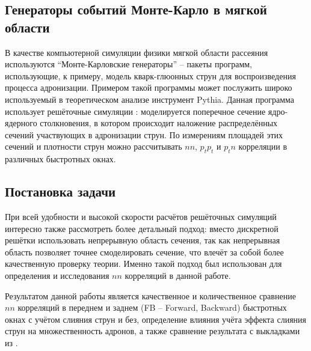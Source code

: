 \subsection{Генераторы событий Монте-Карло в мягкой области}
В качестве компьютерной симуляции физики мягкой области рассеяния используются ``Монте-Карловские генераторы'' \cite{MonteCarlo1,MonteCarlo2} -- пакеты программ, использующие, к примеру, модель кварк-глюонных струн для воспроизведения процесса адронизации. Примером такой программы может послужить широко используемый в теоретическом анализе инструмент Pythia. Данная программа использует решёточные симуляции \cite{TransLattice1,TransLattice2}: моделируется поперечное сечение ядро-ядерного столкновения, в котором происходит наложение распределённых сечений участвующих в адронизации струн. По измерениям площадей этих сечений и плотности струн можно рассчитывать $nn$, $p_t p_t$ и $p_t n$ корреляции в различных быстротных окнах.
\subsection{Постановка задачи}
При всей удобности и высокой скорости расчётов решёточных симуляций интересно также рассмотреть более детальный подход: вместо дискретной решётки использовать непрерывную область сечения, так как непрерывная область позволяет точнее смоделировать сечение, что влечёт за собой более качественную проверку теории. Именно такой подход был использован для определения и исследования $nn$ корреляций в данной работе. 

Результатом данной работы является качественное и количественное сравнение $nn$ корреляций в переднем и заднем (FB -- Forward, Backward) быстротных окнах с учётом слияния струн и без, определение влияния учёта эффекта слияния струн на множественность адронов, а также сравнение результата с выкладками из \cite{bStatement}.